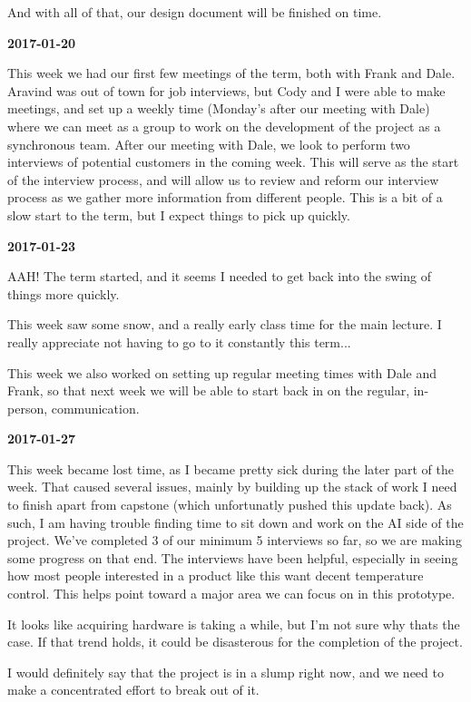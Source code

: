 And with all of that, our design document will be finished on time.

\textbf{2017-01-20}

This week we had our first few meetings of the term, both with Frank and Dale. Aravind was out of town for job interviews, but Cody and I were able to make meetings, and set up a weekly time (Monday's after our meeting with Dale) where we can meet as a group to work on the development of the project as a synchronous team.
After our meeting with Dale, we look to perform two interviews of potential customers in the coming week. This will serve as the start of the interview process, and will allow us to review and reform our interview process as we gather more information from different people. This is a bit of a slow start to the term, but I expect things to pick up quickly.

\textbf{2017-01-23}

AAH! The term started, and it seems I needed to get back into the swing of things more quickly.

This week saw some snow, and a really early class time for the main lecture. I really appreciate not having to go to it constantly this term...

This week we also worked on setting up regular meeting times with Dale and Frank, so that next week we will be able to start back in on the regular, in-person, communication.

\textbf{2017-01-27}

This week became lost time, as I became pretty sick during the later part of the week.
That caused several issues, mainly by building up the stack of work I need to finish apart from capstone (which unfortunatly pushed this update back).
As such, I am having trouble finding time to sit down and work on the AI side of the project.
We've completed 3 of our minimum 5 interviews so far, so we are making some progress on that end.
The interviews have been helpful, especially in seeing how most people interested in a product like this want decent temperature control.
This helps point toward a major area we can focus on in this prototype.

It looks like acquiring hardware is taking a while, but I'm not sure why thats the case.
If that trend holds, it could be disasterous for the completion of the project.

I would definitely say that the project is in a slump right now, and we need to make a concentrated effort to break out of it.

